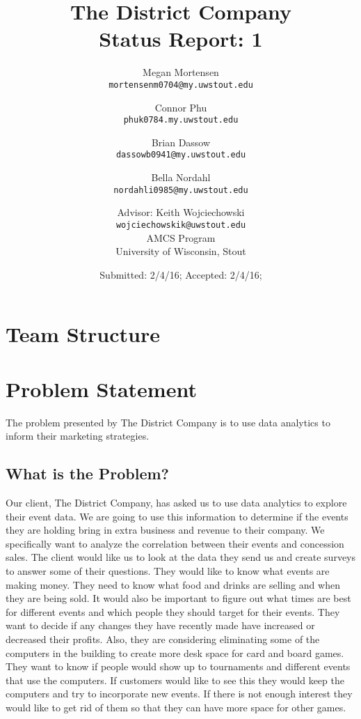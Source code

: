 \documentclass[11pt]{report}
\title{The District Company \\ Status Report: 1}
\author{
Megan Mortensen\\
\small \texttt{mortensenm0704@my.uwstout.edu}
\and
Connor Phu\\
\small \texttt{phuk0784.my.uwstout.edu}
\and
Brian Dassow\\
\small \texttt{dassowb0941@my.uwstout.edu}
\and
Bella Nordahl\\
\small \texttt{nordahli0985@my.uwstout.edu}
\and
Advisor: Keith Wojciechowski\\
\small \texttt{wojciechowskik@uwstout.edu}\\
\bigskip
AMCS Program\\
University of Wisconsin, Stout
}
\date{\small Submitted: 2/4/16;  Accepted: 2/4/16;}
\begin{document}
\maketitle

\section*{\hspace{-.5cm} Team Structure}


\section*{\hspace{-.5cm} Problem Statement}\label{intro}
The problem presented by The District Company is to use data analytics to inform
their marketing strategies.




\subsection*{\hspace{-.5cm} What is the Problem?}\label{tech}
Our client, The District Company, has asked us to use data analytics to explore
their event data. We are going to use this information to determine if the events they are holding bring in extra business and revenue to their company. We specifically want to analyze the correlation between their events and concession sales.
\newline
                The client would like us to look at the data they send us and create surveys to answer some of their questions.  They would like to know what events are making money.  They need to know what food and drinks are selling and when they are being sold.  It would also be important to figure out what times are best for different events and which people they should target for their events.  They want to decide if any changes they have recently made have increased or decreased their profits. 
\newline
            Also, they are considering eliminating some of the computers in the building to create more desk space for card and board games.  They want to know if people would show up to tournaments and different events that use the computers.  If customers would like to see this they would keep the computers and try to incorporate new events.  If there is not enough interest they would like to get rid of them so that they can have more space for other games.  
\end{document}
